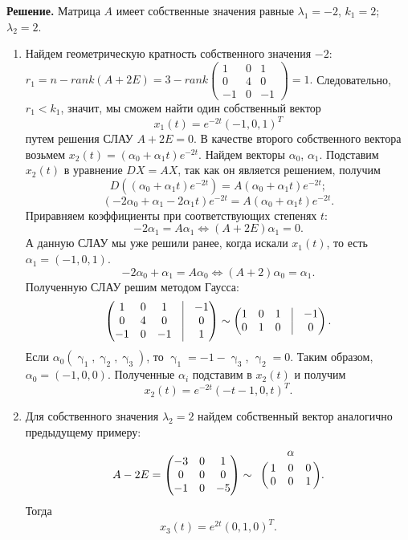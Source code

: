\documentclass[a4paper, 12pt]{article}
\begin{document}
\textbf{Решение.} Матрица $A$ имеет собственные значения равные $\lambda_1 = -2$, $k_1 = 2$; $\lambda_2 = 2$. \begin{enumerate}
	\item Найдем геометрическую кратность собственного значения $-2$:
	$r_1 = n - rank(A + 2E) = 3 - rank\begin{pmatrix}
		1 & 0 & 1\\
		0 & 4 & 0\\
		-1 & 0 & -1
	\end{pmatrix} = 1.$
	Следовательно, $r_1 < k_1$, значит, мы сможем найти один собственный вектор $$x_1(t) = e^{-2t}(-1, 0, 1)^T$$ путем решения СЛАУ $A+ 2E = 0$. В качестве второго собственного вектора возьмем $x_2(t) = (\alpha_0 + \alpha_1t)e^{-2t}$. Найдем векторы $\alpha_0$, $\alpha_1$. Подставим $x_2(t)$ в уравнение $DX = AX$, так как он является решением, получим $$D((\alpha_0 + \alpha_1t)e^{-2t}) = A(\alpha_0 + \alpha_1t)e^{-2t};$$
	$$(-2\alpha_0 + \alpha_1 - 2\alpha_1 t)e^{-2t} = A(\alpha_0 + \alpha_1t)e^{-2t}.$$
	Приравняем коэффициенты при соответствующих степенях $t$:
	$$-2\alpha_1 = A\alpha_1 \Longleftrightarrow (A + 2E) \alpha_1 = 0.$$
	А данную СЛАУ мы уже решили ранее, когда искали $x_1(t)$, то есть $\alpha_1 = (-1, 0, 1)$.
	$$-2\alpha_0 + \alpha_1 = A\alpha_0\Longleftrightarrow (A+2)\alpha_0 = \alpha_1.$$
	Полученную СЛАУ решим методом Гаусса:
	$$\begin{pmatrix}
		1 & 0 & 1 & \vline & -1\\
		0 & 4 & 0 &\vline & 0\\
		-1 & 0 & -1 & \vline & 1\\
	\end{pmatrix}\sim \begin{pmatrix}
		1 & 0 & 1 & \vline & -1\\
		0 & 1 & 0 &\vline & 0
	\end{pmatrix}.$$ Если $\alpha_0(\upgamma_1, \upgamma_2, \upgamma_3)$, то $\upgamma_1 = -1 - \upgamma_3$, $\upgamma_2 = 0$. Таким образом, $\alpha_0 = (-1, 0, 0)$. Полученные $\alpha_i$ подставим в $x_2(t)$ и получим $$x_2(t) = e^{-2t}(-t-1, 0, t)^T.$$
\item Для собственного значения $\lambda_2 = 2$ найдем собственный вектор аналогично предыдущему примеру:
$$A-2E = \begin{pmatrix}
	-3 & 0 & 1\\
	0 & 0 & 0\\
	-1 & 0 & -5
\end{pmatrix}\sim \bordermatrix{
& & \alpha &\cr
&1 & 0 & 0\cr
&0 & 0 &  1\cr
}.$$ Тогда $$x_3(t) = e^{2t}(0,1,0)^T.$$
\end{enumerate}
\end{document}
